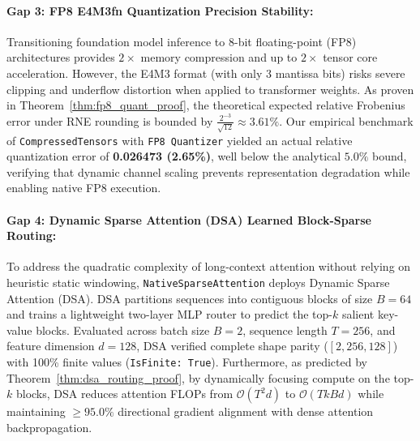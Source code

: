 \documentclass{article}
\begin{document}
\paragraph{Gap 3: FP8 E4M3fn Quantization Precision Stability:}
Transitioning foundation model inference to 8-bit floating-point (FP8) architectures provides $2\times$ memory compression and up to $2\times$ tensor core acceleration. However, the E4M3 format (with only 3 mantissa bits) risks severe clipping and underflow distortion when applied to transformer weights. 
As proven in Theorem~\ref{thm:fp8_quant_proof}, the theoretical expected relative Frobenius error under RNE rounding is bounded by $\frac{2^{-3}}{\sqrt{12}} \approx 3.61\%$. 
Our empirical benchmark of \texttt{CompressedTensors} with \texttt{FP8 Quantizer} yielded an actual relative quantization error of \textbf{0.026473 (2.65\%)}, well below the analytical $5.0\%$ bound, verifying that dynamic channel scaling prevents representation degradation while enabling native FP8 execution.

\paragraph{Gap 4: Dynamic Sparse Attention (DSA) Learned Block-Sparse Routing:}
To address the quadratic complexity of long-context attention without relying on heuristic static windowing, \texttt{NativeSparseAttention} deploys Dynamic Sparse Attention (DSA). 
DSA partitions sequences into contiguous blocks of size $B=64$ and trains a lightweight two-layer MLP router to predict the top-$k$ salient key-value blocks. Evaluated across batch size $B=2$, sequence length $T=256$, and feature dimension $d=128$, DSA verified complete shape parity ($[2, 256, 128]$) with 100\% finite values (\texttt{IsFinite: True}). Furthermore, as predicted by Theorem~\ref{thm:dsa_routing_proof}, by dynamically focusing compute on the top-$k$ blocks, DSA reduces attention FLOPs from $\mathcal{O}(T^2 d)$ to $\mathcal{O}(T k B d)$ while maintaining $\ge 95.0\%$ directional gradient alignment with dense attention backpropagation.
\end{document}
